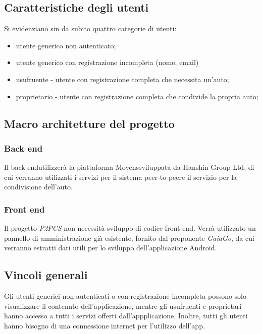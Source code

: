 \subsection{Caratteristiche degli utenti}
Si evidenziano sin da subito quattro categorie di utenti:
\begin{itemize}
	\item utente generico non autenticato;
	\item utente generico con registrazione incompleta (nome, email)
	\item usufruente - utente con registrazione completa che necessita un'auto;
	\item proprietario - utente con registrazione completa che condivide la propria auto;
\end{itemize}

\subsection{Macro architetture del progetto}
\subsubsection{Back end}
Il back end\glosp utilizzerà la piattaforma Movens\glosp sviluppata da Hanshin Group Ltd, di cui verranno utilizzati i servizi per il sistema peer-to-peer\glosp e il servizio per la condivisione dell'auto. 

\subsubsection{Front end}
Il progetto \textit{P2PCS} non necessità sviluppo di codice front-end.
Verrà utilizzato un pannello di amministrazione già esistente, fornito dal proponente \textit{GaiaGo}, da cui verranno estratti dati utili per lo sviluppo dell'applicazione Android.

\subsection{Vincoli generali}
Gli utenti generici non autenticati o con registrazione incompleta possono solo visualizzare il contenuto dell'applicazione, mentre gli usufruenti e proprietari hanno accesso a tutti i servizi offerti dall'appplicazione. Inoltre, tutti gli utenti hanno bisogno di una connessione internet per l'utilizzo dell'app.

 
